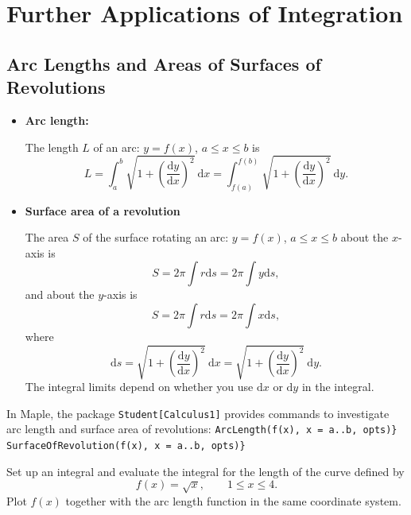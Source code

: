 \documentclass[
  en,11pt,simple]{elegantbook}
\renewenvironment{example}[1][]{
  \refstepcounter{exam}
  \par\noindent\textbf{\color{main}{\examplename} \theexam #1}
  \rmfamily
}{
  \par\ignorespacesafterend
}
\begin{document}
\hypertarget{further-applications-of-integration}{%
\chapter{Further Applications of Integration}\label{further-applications-of-integration}}

\hypertarget{arc-lengths-and-areas-of-surfaces-of-revolutions}{%
\section{Arc Lengths and Areas of Surfaces of Revolutions}\label{arc-lengths-and-areas-of-surfaces-of-revolutions}}

\begin{itemize}
\item
  \textbf{Arc length:}

  The length \(L\) of an arc: \(y=f(x)\), \(a\leq x \leq b\) is
  \[
  L=\int_a^b\sqrt{1+\left(\frac{\mathrm{d} y}{\mathrm{d} x}\right)^2}~\mathrm{d} x=\int_{f(a)}^{f(b)}\sqrt{1+\left(\frac{\mathrm{d} y}{\mathrm{d} x}\right)^2}~\mathrm{d} y.
  \]
\item
  \textbf{Surface area of a revolution}

  The area \(S\) of the surface rotating an arc: \(y=f(x)\), \(a\leq x \leq b\) about the \(x\)-axis is
  \[
  S=2\pi\int r\mathrm{d} s = 2\pi\int y\mathrm{d} s,
  \]
  and about the \(y\)-axis is
  \[
  S=2\pi\int r\mathrm{d} s = 2\pi\int x\mathrm{d} s,
  \]
  where
  \[\mathrm{d} s=\sqrt{1+\left(\frac{\mathrm{d} y}{\mathrm{d} x}\right)^2}~\mathrm{d} x = \sqrt{1+\left(\frac{\mathrm{d} y}{\mathrm{d} x}\right)^2}~\mathrm{d} y.
  \]
  The integral limits depend on whether you use \(\mathrm{d} x\) or \(\mathrm{d}y\) in the integral.
\end{itemize}

In Maple, the package \texttt{Student{[}Calculus1{]}} provides commands to investigate arc length and surface area of revolutions:
\texttt{ArcLength(f(x),\ x\ =\ a..b,\ opts)\}}
\texttt{SurfaceOfRevolution(f(x),\ x\ =\ a..b,\ opts)\}}

\begin{example}

Set up an integral and evaluate the integral for the length of the curve defined by
\[
f(x)=\sqrt{x},\qquad 1\leq x\leq 4.
\]
Plot \(f(x)\) together with the arc length function in the same coordinate system.
\end{example}
\end{document}
